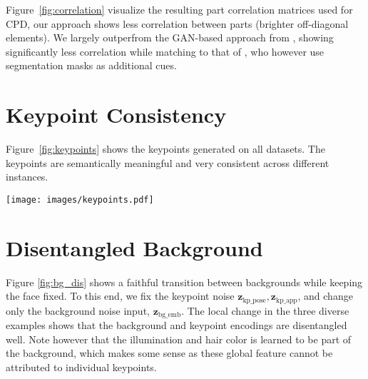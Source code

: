\documentclass[10pt, conference, compsocconf]{IEEEtran}
\newcommand{\vz}{\mathbf{z}}
\begin{document}
 \begin{figure*}[t]
 \caption{\textbf{Disentanglement comparison using CPD.} We plot the correlation matrix to visualize the part distanglement for SEAN \cite{zhu2020sean}, GANLocalEditing \cite{collins2020editing} and ours. Note that on FFHQ we do not include background to make a fair comparison with GANLocalEditing.
 }
 \label{fig:correlation}
 \end{figure*}

Figure~\ref{fig:correlation} visualize the resulting part correlation matrices used for CPD, our approach shows less correlation between parts (brighter off-diagonal elements). We largely outperfrom the GAN-based approach from \cite{collins2020editing}, showing significantly less correlation while matching to that of \cite{zhu2020sean}, who however use segmentation masks as additional cues.

%
 \section{Keypoint Consistency} Figure~\ref{fig:keypoints} shows the keypoints generated on all datasets. The keypoints are semantically meaningful and very consistent across different instances.

\begin{figure*}[ht]
\begin{center}
   \texttt{[image: images/keypoints.pdf]}
\end{center}
   \caption{\textbf{Keypoints.} We show the keypoints on each dataset.}
\label{fig:keypoints}
\end{figure*}

\section{Disentangled Background}
Figure \ref{fig:bg_dis} shows a faithful transition between backgrounds while keeping the face fixed. To this end, we fix the keypoint noise $\vz_\text{kp\_pose},\allowbreak \vz_\text{kp\_app}$, and change only the background noise input, $\vz_\text{bg\_emb}$. The local change in the three diverse examples shows that the background and keypoint encodings are disentangled well. Note however that the illumination and hair color is learned to be part of the background, which makes some sense as these global feature cannot be attributed to individual keypoints.
\end{document}

